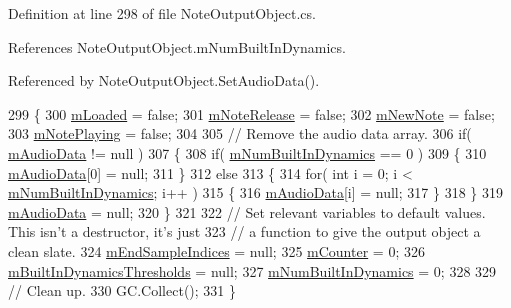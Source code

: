 Definition at line 298 of file Note\+Output\+Object.\+cs.



References Note\+Output\+Object.\+m\+Num\+Built\+In\+Dynamics.



Referenced by Note\+Output\+Object.\+Set\+Audio\+Data().


\begin{DoxyCode}
299     \{
300         \hyperlink{group___n_o_o_priv_var_gaf01d2583555de6a523cdf82808718ca9}{mLoaded} = \textcolor{keyword}{false};
301         \hyperlink{group___n_o_o_priv_var_ga88bfcc80d0cd20c81cd89d19d3231b84}{mNoteRelease} = \textcolor{keyword}{false};
302         \hyperlink{group___n_o_o_priv_var_gac537ec036adf0645dca2f31fbc5b3dec}{mNewNote} = \textcolor{keyword}{false};
303         \hyperlink{group___n_o_o_priv_var_ga4417170b8fa977f05a0b4cd0d16412fd}{mNotePlaying} = \textcolor{keyword}{false};
304 
305         \textcolor{comment}{// Remove the audio data array.}
306         \textcolor{keywordflow}{if}( \hyperlink{group___n_o_o_priv_var_ga842eef5bfade070f914b8a551b3bcf43}{mAudioData} != null )
307         \{
308             \textcolor{keywordflow}{if}( \hyperlink{group___n_o_o_priv_var_ga3cc04564fcc1b1c4597af18e7e4fbc47}{mNumBuiltInDynamics} == 0 )
309             \{
310                 \hyperlink{group___n_o_o_priv_var_ga842eef5bfade070f914b8a551b3bcf43}{mAudioData}[0] = null;
311             \}
312             \textcolor{keywordflow}{else}
313             \{
314                 \textcolor{keywordflow}{for}( \textcolor{keywordtype}{int} i = 0; i < \hyperlink{group___n_o_o_priv_var_ga3cc04564fcc1b1c4597af18e7e4fbc47}{mNumBuiltInDynamics}; i++ )
315                 \{
316                     \hyperlink{group___n_o_o_priv_var_ga842eef5bfade070f914b8a551b3bcf43}{mAudioData}[i] = null;
317                 \}
318             \}
319             \hyperlink{group___n_o_o_priv_var_ga842eef5bfade070f914b8a551b3bcf43}{mAudioData} = null;
320         \}
321 
322         \textcolor{comment}{// Set relevant variables to default values. This isn't a destructor, it's just}
323         \textcolor{comment}{// a function to give the output object a clean slate. }
324         \hyperlink{group___n_o_o_priv_var_ga48c676306790f40714072cd6a81a0128}{mEndSampleIndices} = null;
325         \hyperlink{group___n_o_o_priv_var_ga5dca97be8d58837ace4ea6f4a972b20a}{mCounter} = 0;
326         \hyperlink{group___n_o_o_priv_var_ga6a530f5e624caf8087c636df98d7f0b0}{mBuiltInDynamicsThresholds} = null;
327         \hyperlink{group___n_o_o_priv_var_ga3cc04564fcc1b1c4597af18e7e4fbc47}{mNumBuiltInDynamics} = 0;
328 
329         \textcolor{comment}{// Clean up.}
330         GC.Collect();
331     \}
\end{DoxyCode}
